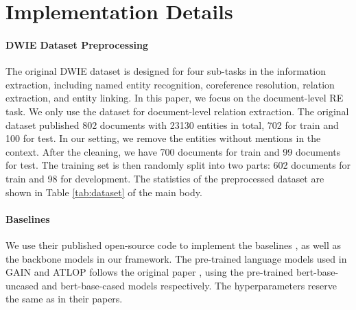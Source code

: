 \documentclass[11pt]{article}
\begin{document}
\section{Implementation Details}
\label{sec:appendix:imp}

\paragraph{DWIE Dataset Preprocessing}
The original DWIE dataset \cite{zaporojets2020dwie} is designed for four sub-tasks in the information extraction, including named entity recognition, coreference resolution, relation extraction, and entity linking. In this paper, we focus on the document-level RE task. We only use the dataset for document-level relation extraction. The original dataset published 802 documents with 23130 entities in total, 702 for train and 100 for test. In our setting, we remove the entities without mentions in the context. After the cleaning, we have 700 documents for train and 99 documents for test. The training set is then randomly split into two parts: 602 documents for train and 98 for development. The statistics of the preprocessed dataset are shown in Table \ref{tab:dataset} of the main body.

\paragraph{Baselines}
We use their published open-source code to implement the baselines \cite{yao-etal-2019-docred, zeng-etal-2020-double, zhou2021atlop}, as well as the backbone models in our framework. The pre-trained language models used in GAIN and ATLOP follows the original paper \cite{zeng-etal-2020-double, zhou2021atlop}, using the pre-trained bert-base-uncased and bert-base-cased models respectively. The hyperparameters reserve the same as in their papers.










 
\end{document}
